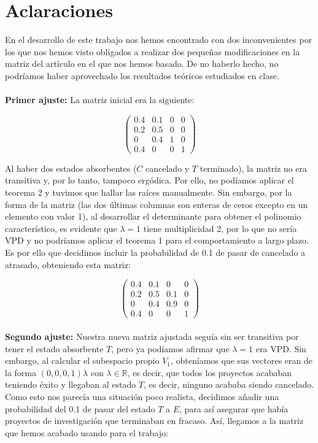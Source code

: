 \documentclass[10pt,a4paper]{article}
\begin{document}
\section{Aclaraciones}
En el desarrollo de este trabajo nos hemos encontrado con dos inconvenientes por los que nos hemos visto obligados a realizar dos pequeñas modificaciones en la matriz del artículo en el que nos hemos basado. De no haberlo hecho, no podríamos haber aprovechado los resultados teóricos estudiados en clase. \\
\\
\textbf{Primer ajuste:} La matriz inicial era la siguiente:

\[
\begin{pmatrix}
0.4 & 0.1 & 0 & 0 \\
0.2 & 0.5 & 0 & 0 \\
0 & 0.4 & 1 & 0 \\
0.4 & 0 & 0 & 1 
\end{pmatrix}
\]

Al haber dos estados absorbentes ($C$ cancelado y $T$ terminado), la matriz no era transitiva y, por lo tanto, tampoco ergódica. Por ello, no podíamos aplicar el teorema 2 y tuvimos que hallar las raíces manualmente. Sin embargo, por la forma de la matriz (las dos últimas columnas son enteras de ceros excepto en un elemento con valor 1), al desarrollar el determinante para obtener el polinomio característico, es evidente que $\lambda = 1$ tiene multiplicidad 2, por lo que no sería VPD y no podríamos aplicar el teorema 1 para el comportamiento a largo plazo. Es por ello que decidimos incluir la probabilidad de 0.1 de pasar de cancelado a atrasado, obteniendo esta matriz:

\[
\begin{pmatrix}
0.4 & 0.1 & 0 & 0 \\
0.2 & 0.5 & 0.1 & 0 \\
0 & 0.4 & 0.9 & 0 \\
0.4 & 0 & 0 & 1 
\end{pmatrix}
\]
\\
\textbf{Segundo ajuste:} Nuestra nueva matriz ajustada seguía sin ser transitiva por tener el estado absorbente $T$, pero ya podíamos afirmar que $\lambda = 1$ era VPD. Sin embargo, al calcular el subespacio propio $V_1$, obteníamos que sus vectores eran de la forma $(0,0,0,1)\lambda$ con $\lambda \in \mathbb{R}$, es decir, que todos los proyectos acababan teniendo éxito y llegaban al estado $T$, es decir, ninguno acababa siendo cancelado. Como esto nos parecía una situación poco realista, decidimos añadir una probabilidad del 0.1 de pasar del estado $T$ a $E$, para así asegurar que había proyectos de investigación que terminaban en fracaso. Así, llegamos a la matriz que hemos acabado usando para el trabajo:
\end{document}
